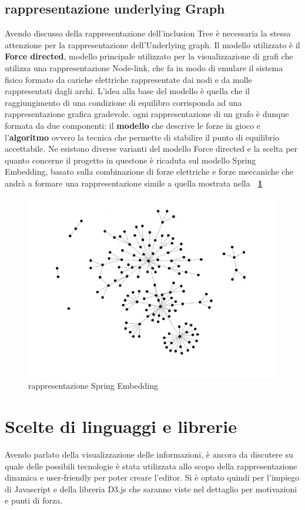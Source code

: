 {\subsection{rappresentazione underlying Graph}
Avendo discusso della rappresentazione dell'inclusion Tree è necessaria la stessa attenzione per la rappresentazione dell'Underlying graph. Il modello utilizzato è il \textbf{Force directed}, modello principale utilizzato per la visualizzazione di grafi che utilizza una rappresentazione Node-link, che fa in modo di emulare il sistema fisico formato da cariche elettriche rappresentate dai nodi e da molle rappresentati dagli archi. L'idea alla base del modello è quella che il raggiungimento di una condizione di equilibro corrisponda ad una rappresentazione grafica gradevole. ogni rappresentazione di un grafo è dunque formata da due componenti: il \textbf{modello} che descrive le forze in gioco e l'\textbf{algoritmo} ovvero la tecnica che permette di stabilire il punto di equilibrio accettabile. Ne esistono diverse varianti del modello Force directed e la scelta per quanto concerne il progetto in questone è ricaduta sul modello Spring Embedding, basato sulla combinazione di forze elettriche e forze meccaniche che andrà a formare una rappresentazione simile a quella mostrata nella \textbf{\figurename~\ref{fig:spring}}   
\begin{figure}[!htb]
	\begin{center}
		\includegraphics[width=0.8 \linewidth]{figure/spring}
	\end{center}
	\caption{rappresentazione Spring Embedding\label{fig:spring}}
\end{figure}
\section{Scelte di linguaggi e librerie}
Avendo parlato della visualizzazione delle informazioni, è ancora da discutere su quale delle possibili tecnologie è stata utilizzata allo scopo della rappresentazione dinamica e user-friendly per poter creare l'editor.
Si è optato quindi per l'impiego di Javascript e della libreria D3.js che saranno viste nel dettaglio per motivazioni e punti di forza.
}
